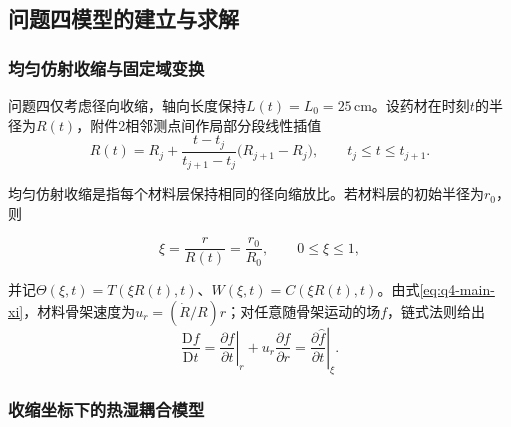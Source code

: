 \documentclass[withoutpreface,bwprint]{cumcmthesis}
\begin{document}
\subsection{问题四模型的建立与求解}

\subsubsection{均匀仿射收缩与固定域变换}

问题四仅考虑径向收缩，轴向长度保持$L(t)=L_0=25\,\mathrm{cm}$。设药材在时刻$t$的半径为$R(t)$，附件2相邻测点间作局部分段线性插值
\begin{equation}
R(t)=R_j+\frac{t-t_j}{t_{j+1}-t_j}\bigl(R_{j+1}-R_j\bigr),
\qquad t_j\le t\le t_{j+1}.
\label{eq:q4-main-radius}
\end{equation}

均匀仿射收缩是指每个材料层保持相同的径向缩放比。若材料层的初始半径为$r_0$，则

\begin{equation}
\xi=\frac{r}{R(t)}=\frac{r_0}{R_0},
\qquad 0\le\xi\le1,
\label{eq:q4-main-xi}
\end{equation}

并记$\Theta(\xi,t)=T(\xi R(t),t)$、$W(\xi,t)=C(\xi R(t),t)$。由式\eqref{eq:q4-main-xi}，材料骨架速度为$u_r=(\dot R/R)r$；对任意随骨架运动的场$f$，链式法则给出
\begin{equation}
\frac{\mathrm Df}{\mathrm Dt}
=\left.\frac{\partial f}{\partial t}\right|_r
+u_r\frac{\partial f}{\partial r}
=\left.\frac{\partial \widehat f}{\partial t}\right|_\xi.
\label{eq:q4-main-material-derivative}
\end{equation}

\subsubsection{收缩坐标下的热湿耦合模型}
\end{document}

